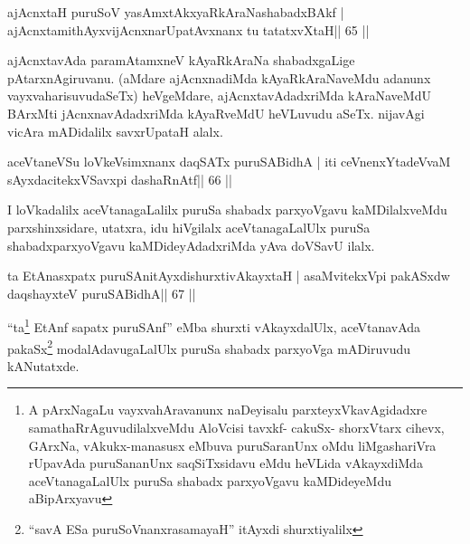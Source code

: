 

\begin{shl}
ajAcnxtaH puruSoV yasAmxtAkxyaRkAraNashabadxBAkf |
ajAcnxtamithAyxvijAcnxnarUpatAvxnanx tu tatatxvXtaH\hfill || 65 ||
\end{shl}

\begin{artha}
ajAcnxtavAda paramAtamxneV kAyaRkAraNa shabadxgaLige
pAtarxnAgiruvanu.  (aMdare ajAcnxnadiMda kAyaRkAraNaveMdu adanunx
vayxvaharisuvudaSeTx) heVgeMdare, ajAcnxtavAdadxriMda kAraNaveMdU BArxMti
jAcnxnavAdadxriMda kAyaRveMdU heVLuvudu aSeTx. nijavAgi vicAra
mADidalilx savxrUpataH alalx. 
\end{artha}




\begin{shl}
aceVtaneVSu loVkeV\s simxnanx daqSATx puruSABidhA |
iti ceVnenxYtadeVvaM sAyxdacitekxVSavxpi dashaRnAtf\hfill || 66 ||
\end{shl}

\begin{artha}
I loVkadalilx aceVtanagaLalilx puruSa shabadx parxyoVgavu kaMDilalxveMdu parxshinxsidare, utatxra, idu hiVgilalx aceVtanagaLalUlx puruSa shabadxparxyoVgavu kaMDideyAdadxriMda yAva doVSavU ilalx.
\end{artha}



\begin{shl}
ta EtAnasxpatx puruSAnitAyxdishurxtivAkayxtaH |
asaMvitekxV\s pi pakASxdw daqshayxteV puruSABidhA\hfill || 67 ||
\end{shl}

\begin{artha}
``ta\footnote{A pArxNagaLu vayxvahAravanunx naDeyisalu
    parxteyxVkavAgidadxre samathaRrAguvudilalxveMdu AloVcisi tavxkf-
    cakuSx- shorxVtarx cihevx, GArxNa, vAkukx-manasusx eMbuva
    puruSaranUnx oMdu liMgashariVra rUpavAda puruSananUnx
    saqSiTxsidavu eMdu heVLida vAkayxdiMda aceVtanagaLalUlx puruSa
    shabadx parxyoVgavu kaMDideyeMdu aBipArxyavu} EtAnf sapatx puruSAnf'' eMba shurxti vAkayxdalUlx,
  aceVtanavAda pakaSx\footnote{``savA ESa puruSoV\s nanxrasamayaH''
    itAyxdi shurxtiyalilx} modalAdavugaLalUlx puruSa shabadx
  parxyoVga mADiruvudu kANutatxde.
\end{artha}

